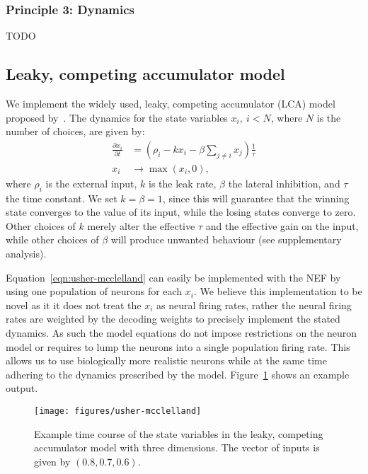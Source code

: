 \documentclass[10pt,letterpaper]{article}
\begin{document}
\subsubsection{Principle 3: Dynamics}
TODO

\subsection{Leaky, competing accumulator model}
We implement the widely used, leaky, competing accumulator (LCA) model proposed 
by~.  The dynamics for the state variables $x_i,\ i < N$, where 
$N$ is the number of choices, are given by:
\begin{equation} \label{eqn:usher-mcclelland}
    \begin{split}
        \frac{{\partial x}_i}{\partial t} &= \left(\rho_i - kx_i - \beta \sum_{j \neq i} x_j\right) \frac{1}{\tau} \\
        x_i &\rightarrow \max(x_i, 0) ,
    \end{split}
\end{equation}
where $\rho_i$ is the external input, $k$ is the leak rate, $\beta$ the lateral 
inhibition, and $\tau$ the time constant.
We set $k = \beta = 1$, since this will guarantee that the winning state converges to the value of its input, while the losing states converge to zero.
Other choices of $k$ merely alter the effective $\tau$ and the effective gain on the input, while other choices of $\beta$ will produce unwanted behaviour (see supplementary analysis).

Equation~\ref{eqn:usher-mcclelland} can easily be implemented with the NEF by 
using one population of neurons for each $x_i$.  We believe this implementation 
to be novel as it it does not treat the $x_i$ as neural firing rates, rather the 
neural firing rates are weighted by the decoding weights to precisely implement 
the stated dynamics. As such the model equations do not impose restrictions on 
the neuron model or requires to lump the neurons into a single population firing 
rate. This allows us to use biologically more realistic neurons while at the 
same time adhering to the dynamics prescribed by the model.  
Figure~\ref{fig:usher-mcclelland} shows an example output.
\begin{figure}
    \centering
    \texttt{[image: figures/usher-mcclelland]}
    \caption{Example time course of the state variables in the leaky, competing 
        accumulator model with three dimensions. The vector of inputs is given 
        by $(0.8, 0.7, 0.6)$.}\label{fig:usher-mcclelland}
\end{figure}
\end{document}
